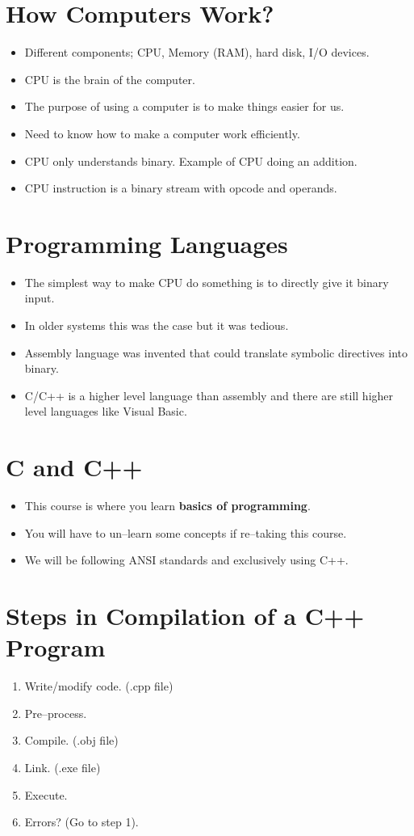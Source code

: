 \documentclass[12pt,a4paper]{article}
\begin{document}
\section{How Computers Work?}
\begin{itemize}
\item Different components; CPU, Memory (RAM), hard disk, I/O devices.
\item CPU is the brain of the computer.
\item The purpose of using a computer is to make things easier for us.
\item Need to know how to make a computer work efficiently.
\item CPU only understands binary. Example of CPU doing an addition.
\item CPU instruction is a binary stream with opcode and operands.
\end{itemize}
\section{Programming Languages}
\begin{itemize}
\item The simplest way to make CPU do something is to directly give it binary input.
\item In older systems this was the case but it was tedious.
\item Assembly language was invented that could translate symbolic directives into binary.
\item C/C++ is a higher level language than assembly and there are still higher level languages like Visual Basic.
\end{itemize}
\section{C and C++}
\begin{itemize}
\item This course is where you learn \textbf{basics of programming}.
\item You will have to un--learn some concepts if re--taking this course.
\item We will be following ANSI standards and exclusively using C++.
\end{itemize}
\section{Steps in Compilation of a C++ Program}
\begin{enumerate}
\item Write/modify code. (.cpp file)
\item Pre--process.
\item Compile. (.obj file)
\item Link. (.exe file)
\item Execute.
\item Errors? (Go to step 1).
\end{enumerate}
\end{document}

